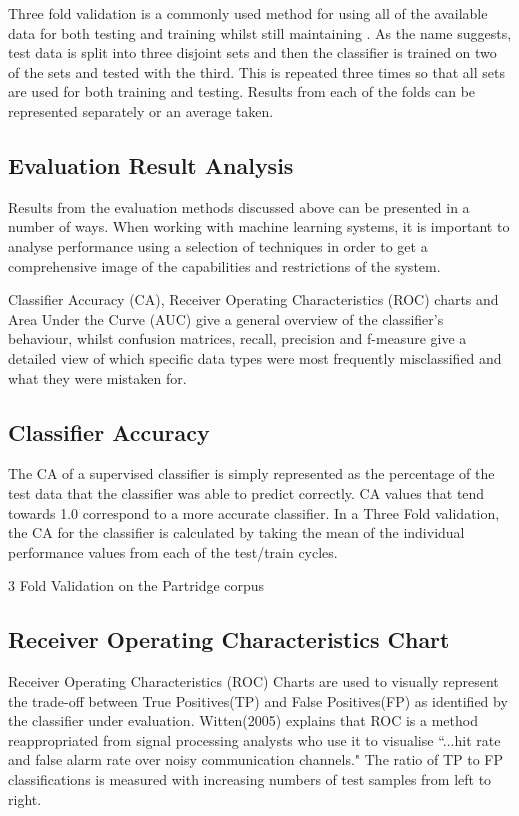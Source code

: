 Three fold validation is a commonly used method for using all of the available
data for both testing and training whilst still maintaining . As the name
suggests, test data is split into three disjoint sets and then the classifier
is trained on two of the sets and tested with the third. This is repeated three
times so that all sets are used for both training and testing. Results from
each of the folds can be represented separately or an average taken.

\subsection{ Evaluation Result Analysis } 

Results from the evaluation methods discussed above can be presented in a
number of ways. When working with machine learning systems, it is important to
analyse performance using a selection of techniques in order to get a
comprehensive image of the capabilities and restrictions of the system.

Classifier Accuracy (CA), Receiver Operating Characteristics
(ROC) charts and Area Under the Curve (AUC) give a general overview of the
classifier's behaviour, whilst confusion matrices, recall, precision and
f-measure give a detailed view of which specific data types were most
frequently misclassified and what they were mistaken for. 

\subsection{ Classifier Accuracy } 

The CA of a supervised classifier is simply represented as the percentage of
the test data that the classifier was able to predict correctly. CA values that
tend towards 1.0 correspond to a more accurate classifier. In a Three Fold
validation, the CA for the classifier is calculated by taking the mean of the
individual performance values from each of the test/train cycles. 

3 Fold Validation on the Partridge corpus  

\subsection{ Receiver Operating Characteristics Chart}

Receiver Operating Characteristics (ROC) Charts are used to visually represent
the trade-off between True Positives(TP) and False Positives(FP) as identified
by the classifier under evaluation. Witten(2005) explains that ROC is a method
reappropriated from signal processing analysts who use it to visualise ``...hit
rate and false alarm rate over noisy communication
channels\cite{witten2005data}." The ratio of TP to FP classifications is
measured with increasing numbers of test samples from left to right. 

